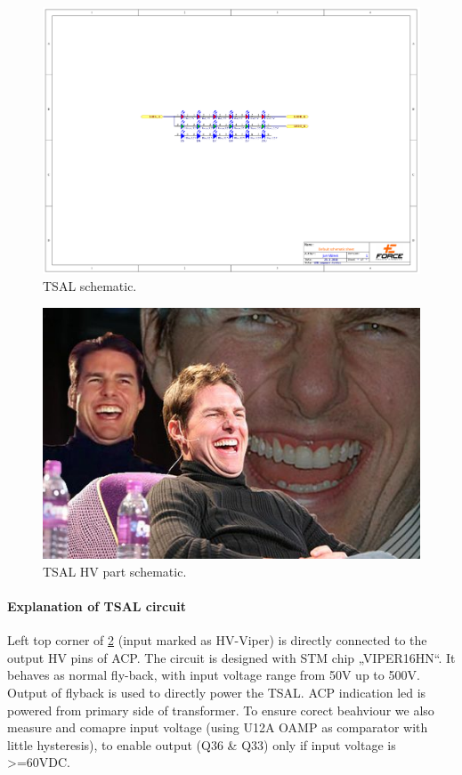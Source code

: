 \begin{figure}[H]
	\centering
	\includegraphics[width=\textwidth,trim={6cm 10cm 6cm 7cm},clip]{./img/TSAL-schematic.pdf}
	\caption{TSAL schematic.}
	\label{fig:TSAL-schematic}
\end{figure}

\begin{figure}[H]
	\centering
	\includegraphics[width=\textwidth]{./img/tsal-wiring.jpg}
	\caption{TSAL HV part schematic.}
	\label{fig:TSAL-HV}
\end{figure}

\paragraph{Explanation of TSAL circuit}

Left top corner of \ref{fig:TSAL-HV} (input marked as HV-Viper) is directly connected to the output HV pins of ACP. The circuit is designed with STM chip „VIPER16HN“. It behaves as normal fly-back, with input voltage range from 50V up to 500V. Output of flyback is used to directly power the TSAL. ACP indication led is powered from primary side of transformer. To ensure corect beahviour we also measure and comapre input voltage (using U12A OAMP as comparator with little hysteresis), to enable output (Q36 \& Q33) only if input voltage is >=60VDC.

